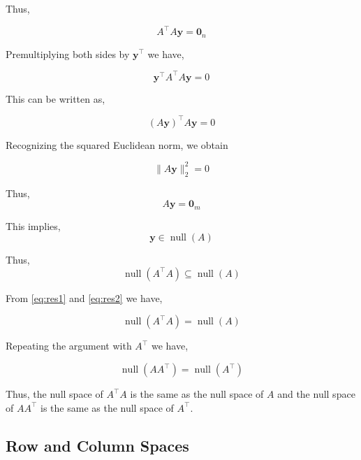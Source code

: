 \documentclass[a4paper]{article}
\begin{document}
Thus,

\begin{equation}
A^{\top}A \boldsymbol{y} = \boldsymbol{0}_n 
\end{equation}

Premultiplying both sides by $\boldsymbol{y}^{\top}$ we have,

\begin{equation}
\boldsymbol{y}^{\top}A^{\top}A \boldsymbol{y} = 0
\end{equation}

This can be written as,

\begin{equation}
\left(A\boldsymbol{y}\right)^{\top}A \boldsymbol{y} = 0
\end{equation}

Recognizing the squared Euclidean norm, we obtain

\begin{equation}
\| A \boldsymbol{y} \|_{2}^{2} = 0
\end{equation}

Thus, \begin{equation}
A \boldsymbol{y} = \boldsymbol{0}_m
\end{equation}

This implies, \begin{equation}
\boldsymbol{y} \in \operatorname{null}(A)
\end{equation}

Thus, 
\begin{equation}
\operatorname{null}(A^{\top}A) \subseteq \operatorname{null}(A)
\label{eq:res2}
\end{equation}

From \ref{eq:res1} and \ref{eq:res2} we have,

\begin{equation}
\operatorname{null}(A^{\top}A) = \operatorname{null}(A)
\end{equation}

Repeating the argument with $A^{\top}$ we have,

\begin{equation}
\operatorname{null}(AA^{\top}) = \operatorname{null}(A^{\top})
\label{eq:AAt}
\end{equation}

Thus, the null space of $A^{\top}A$ is the same as the null space of $A$ and the null space of $AA^{\top}$ is the same as the null space of $A^{\top}$.

\subsection{Row and Column Spaces}
\end{document}
